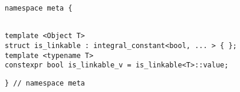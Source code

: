 
\begin{verbatim}
namespace meta {
\end{verbatim}
\begin{verbatim}

template <Object T>
struct is_linkable : integral_constant<bool, ... > { };
template <typename T>
constexpr bool is_linkable_v = is_linkable<T>::value;

\end{verbatim}
\begin{verbatim}
} // namespace meta
\end{verbatim}
